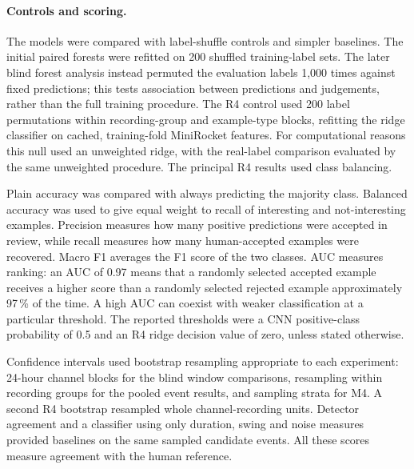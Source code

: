 \paragraph{Controls and scoring.}
The models were compared with label-shuffle controls and simpler baselines. The initial paired forests were refitted on 200 shuffled training-label sets. The later blind forest analysis instead permuted the evaluation labels 1,000 times against fixed predictions; this tests association between predictions and judgements, rather than the full training procedure. The R4 control used 200 label permutations within recording-group and example-type blocks, refitting the ridge classifier on cached, training-fold MiniRocket features. For computational reasons this null used an unweighted ridge, with the real-label comparison evaluated by the same unweighted procedure. The principal R4 results used class balancing.

Plain accuracy was compared with always predicting the majority class. Balanced accuracy was used to give equal weight to recall of interesting and not-interesting examples. Precision measures how many positive predictions were accepted in review, while recall measures how many human-accepted examples were recovered. Macro F1 averages the F1 score of the two classes. AUC measures ranking: an AUC of 0.97 means that a randomly selected accepted example receives a higher score than a randomly selected rejected example approximately 97\,\% of the time. A high AUC can coexist with weaker classification at a particular threshold. The reported thresholds were a CNN positive-class probability of 0.5 and an R4 ridge decision value of zero, unless stated otherwise.

Confidence intervals used bootstrap resampling appropriate to each experiment: 24-hour channel blocks for the blind window comparisons, resampling within recording groups for the pooled event results, and sampling strata for M4. A second R4 bootstrap resampled whole channel-recording units. Detector agreement and a classifier using only duration, swing and noise measures provided baselines on the same sampled candidate events. All these scores measure agreement with the human reference.


